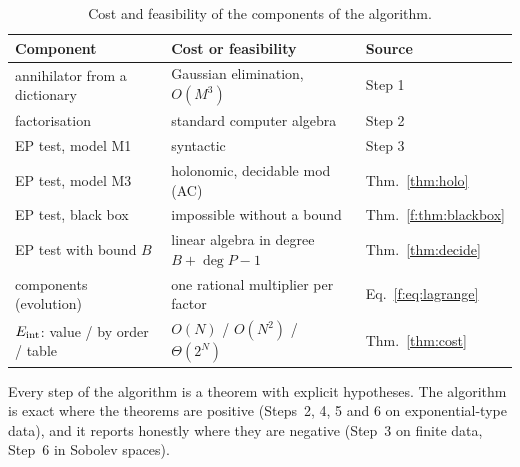\begin{table}[!htb]
\centering\small
\begin{tabular}{@{}L{4.6cm}L{5.6cm}L{3.6cm}@{}}
\toprule
Component & Cost or feasibility & Source\\\midrule
annihilator from a dictionary & Gaussian elimination, $O(M^3)$ & Step 1\\
factorisation & standard computer algebra & Step 2\\
EP test, model M1 & syntactic & Step 3\\
EP test, model M3 & holonomic, decidable mod (AC) & Thm.~\ref{thm:holo}\\
EP test, black box & impossible without a bound & Thm.~\ref{f:thm:blackbox}\\
EP test with bound $B$ & linear algebra in degree $B+\deg P-1$ & Thm.~\ref{thm:decide}\\
components (evolution) & one rational multiplier per factor & Eq.~\eqref{f:eq:lagrange}\\
$E_{\mathrm{int}}$: value / by order / table & $O(N)$ / $O(N^2)$ / $\Theta(2^N)$ & Thm.~\ref{thm:cost}\\
\bottomrule
\end{tabular}
\caption{Cost and feasibility of the components of the algorithm.}\label{tab:complexity}
\end{table}

\begin{keypoint}
Every step of the algorithm is a theorem with explicit hypotheses. The algorithm is exact where the theorems are positive (Steps~2, 4, 5 and 6 on exponential-type data), and it reports honestly where they are negative (Step~3 on finite data, Step~6 in Sobolev spaces).
\end{keypoint}

